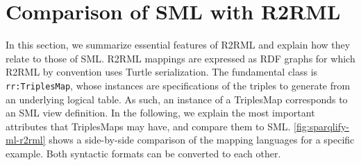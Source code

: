 







\section{Comparison of SML with R2RML}
\label{sec:sml-vs-r2rml}
In this section, we summarize essential features of R2RML and explain how
they relate to those of SML.
R2RML mappings are expressed as RDF graphs for which R2RML by convention uses
Turtle serialization. The fundamental class is \texttt{rr:TriplesMap}, whose
instances are specifications of the triples to generate from an underlying
logical table.
As such, an instance of a TriplesMap corresponds to an SML view definition.
In the following, we explain the most important attributes that TriplesMaps
may have, and compare them to SML.
\autoref{fig:sparqlify-ml-r2rml} shows a side-by-side
comparison of the mapping languages for a specific example.
Both syntactic formats can be converted to each other.

